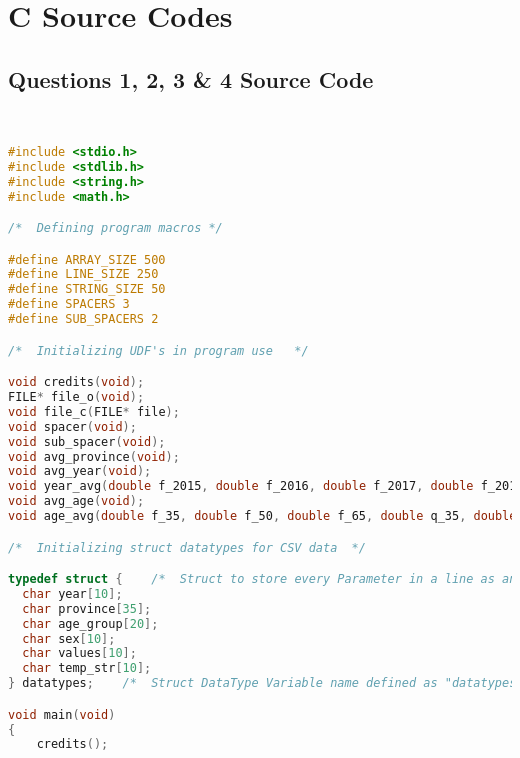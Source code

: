 \newpage

\chapter{{C Source Codes}}\label{pycode}
        
    \section{{Questions 1, 2, 3 \& 4 Source Code}}
        
        \begin{lstlisting}[language=C, caption=\textit{CPS 188 Term Project Source Code}]


#include <stdio.h>
#include <stdlib.h>
#include <string.h>
#include <math.h>

/*  Defining program macros */

#define ARRAY_SIZE 500
#define LINE_SIZE 250
#define STRING_SIZE 50
#define SPACERS 3
#define SUB_SPACERS 2

/*  Initializing UDF's in program use   */

void credits(void);
FILE* file_o(void);
void file_c(FILE* file);
void spacer(void);
void sub_spacer(void);
void avg_province(void);
void avg_year(void);
void year_avg(double f_2015, double f_2016, double f_2017, double f_2018, double f_2019, double f_2020, double f_2021, double q_2015, double q_2016, double q_2017, double q_2018, double q_2019, double q_2020, double q_2021, double o_2015, double o_2016, double o_2017, double o_2018, double o_2019, double o_2020, double o_2021, double a_2015, double a_2016, double a_2017, double a_2018, double a_2019, double a_2020, double a_2021, double b_2015, double b_2016, double b_2017, double b_2018, double b_2019, double b_2020, double b_2021);
void avg_age(void);
void age_avg(double f_35, double f_50, double f_65, double q_35, double q_50, double q_65, double o_35, double o_50, double o_65, double a_35, double a_50, double a_65, double b_35, double b_50, double b_65);

/*  Initializing struct datatypes for CSV data  */

typedef struct {    /*  Struct to store every Parameter in a line as an array of tokens with respect to their induvidual fields */
  char year[10];
  char province[35];
  char age_group[20];
  char sex[10];
  char values[10];
  char temp_str[10];
} datatypes;    /*  Struct DataType Variable name defined as "datatypes"    */

void main(void)
{
	credits();


\end{lstlisting}
